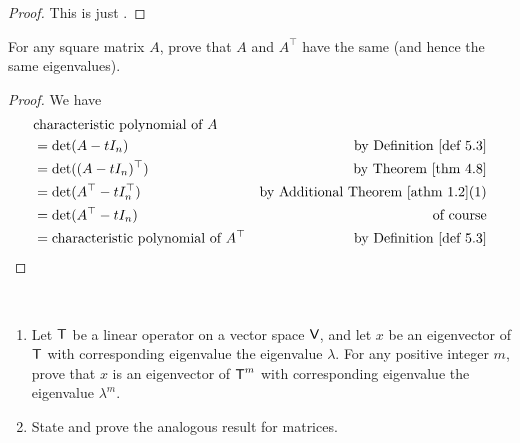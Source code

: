 \begin{proof}
This is just .
\end{proof}

\begin{exercise} \label{exercise 5.1.15}
For any square matrix \(A\), prove that \(A\) and \(A^\top\) have the same \CPOLY{} (and hence the same eigenvalues).
\end{exercise}

\begin{proof}
We have
\begin{align*}
    & \text{\CPOLY{} of \(A\)} \\
    & = \det(A - tI_n) & \text{by \DEF{5.3}} \\
    & = \det((A - tI_n)^\top) & \text{by \THM{4.8}} \\
    & = \det(A^\top - tI_n^\top) & \text{by \ATHM{1.2}(1)} \\
    & = \det(A^\top - tI_n) & \text{of course} \\
    & = \text{\CPOLY{} of \(A^\top\)} & \text{by \DEF{5.3}}
\end{align*}
\end{proof}

\begin{exercise} \label{exercise 5.1.16} \ 

\begin{enumerate}
\item Let \(\textsf{T}\) be a linear operator on a vector space \(\textsf{V}\), and let \(x\) be an eigenvector of \(\textsf{T}\) with corresponding eigenvalue the eigenvalue \(\lambda\).
For any positive integer \(m\), prove that \(x\) is an eigenvector of \(\textsf{T}^m\) with corresponding eigenvalue the eigenvalue \(\lambda^m\).
\item State and prove the analogous result for matrices.
\end{enumerate}
\end{exercise}

